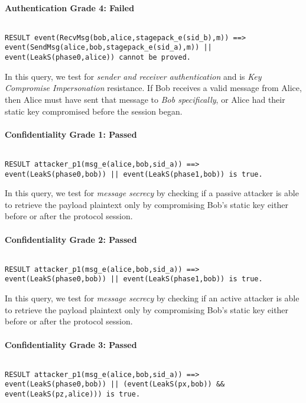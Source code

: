 \paragraph{Authentication Grade 4: Failed}$ $
\begin{lstlisting}
RESULT event(RecvMsg(bob,alice,stagepack_e(sid_b),m)) ==> event(SendMsg(alice,bob,stagepack_e(sid_a),m)) || event(LeakS(phase0,alice)) cannot be proved.
\end{lstlisting}

In this query, we test for \emph{sender and receiver authentication} and is \emph{Key Compromise Impersonation} resistance. If Bob receives a valid message from Alice, then Alice must have sent that message to \emph{Bob specifically}, or Alice had their static key compromised before the session began.


\paragraph{Confidentiality Grade 1: Passed}$ $
\begin{lstlisting}
RESULT attacker_p1(msg_e(alice,bob,sid_a)) ==> event(LeakS(phase0,bob)) || event(LeakS(phase1,bob)) is true.
\end{lstlisting}

In this query, we test for \emph{message secrecy} by checking if a passive attacker is able to retrieve the payload plaintext only by compromising Bob's static key either before or after the protocol session.


\paragraph{Confidentiality Grade 2: Passed}$ $
\begin{lstlisting}
RESULT attacker_p1(msg_e(alice,bob,sid_a)) ==> event(LeakS(phase0,bob)) || event(LeakS(phase1,bob)) is true.
\end{lstlisting}

In this query, we test for \emph{message secrecy} by checking if an active attacker is able to retrieve the payload plaintext only by compromising Bob's static key either before or after the protocol session.


\paragraph{Confidentiality Grade 3: Passed}$ $
\begin{lstlisting}
RESULT attacker_p1(msg_e(alice,bob,sid_a)) ==> event(LeakS(phase0,bob)) || (event(LeakS(px,bob)) && event(LeakS(pz,alice))) is true.
\end{lstlisting}

